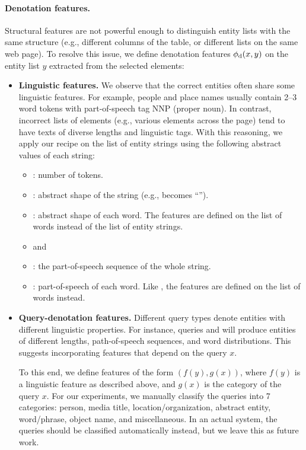 \paragraph{Denotation features.}
Structural features are not powerful enough
to distinguish entity lists with the same structure
(e.g., different columns of the table,
or different lists on the same web page).
To resolve this issue,
we define denotation features $\phi_\mathrm{d}(x, y)$
on the entity list $y$ extracted from the selected elements:

\begin{itemize}
\item \textbf{Linguistic features.}
We observe that the correct entities often share 
some linguistic features.
For example, people and place names usually contain
2--3 word tokens with part-of-speech tag NNP (proper noun).
In contrast, incorrect lists of elements
(e.g., various  elements across the page)
tend to have texts of diverse lengths and linguistic tags.
With this reasoning, we apply our recipe on the list
of entity strings using the following abstract values
of each string:
\begin{itemize}
\item {}: number of tokens.
\item {}: abstract shape of the string
(e.g.,  becomes ``'').
\item {}: abstract shape of each word.
The features are defined on the list of words instead of the
list of entity strings.
\item {} and 
\item {}: the part-of-speech sequence
of the whole string.
\item {}: part-of-speech of each word.
Like ,
the features are defined on the list of words instead.
\end{itemize}

\item \textbf{Query-denotation features.}
Different query types denote entities
with different linguistic properties.
For instance, queries 
and 
will produce entities of different lengths,
path-of-speech sequences, and word distributions.
This suggests incorporating features that depend
on the query $x$.

To this end, we define features of the form
$(f(y), g(x))$, where $f(y)$ is a linguistic feature
as described above, and $g(x)$ is the category of the query $x$.
For our experiments, we manually classify
the queries into 7 categories:
person, media title, location/organization,
abstract entity, word/phrase, object name, and miscellaneous.
In an actual system, the queries
should be classified automatically instead,
but we leave this as future work.
\end{itemize}

